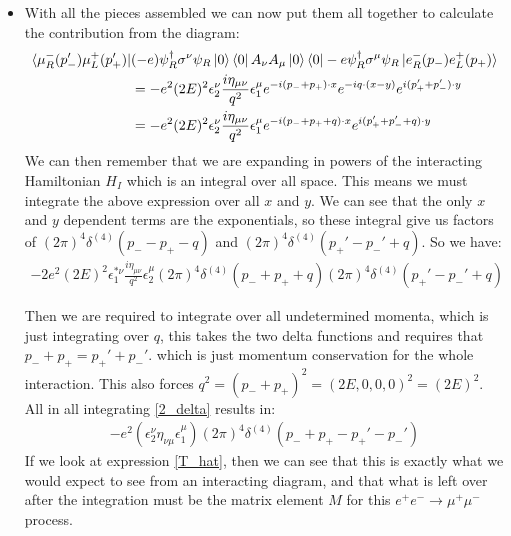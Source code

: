 \documentclass[11pt]{article}
\numberwithin{equation}{section}
\begin{document}
\begin{itemize}
     \item With all the pieces assembled we can now put them all together to calculate the contribution from the diagram:
     \begin{align*}
           \bra{\mu_R^{-}(p_-')\mu_L^{+}(p_+')}&(- e)\psi^{\dagger}_R\sigma^{\nu}\psi_R \ket{0}\bra{0} A_{\nu} A_{\mu}\ket{0}\bra{0}- e\psi^{\dagger}_R\sigma^{\mu}\psi_R\ket{e_R^{-}(p_-)e_L^{+}(p_+)} \\
           & = -e^2(2E)^2\epsilon_2^{\nu}\frac{i\eta_{\mu\nu}}{q^2}\epsilon^{\mu}_1e^{-i(p_-+p_+)\cdot x}e^{-iq \cdot (x - y)}e^{i(p_+'+p_-')\cdot y} \\
            & = -e^2(2E)^2\epsilon_2^{\nu}\frac{i\eta_{\mu\nu}}{q^2}\epsilon^{\mu}_1e^{-i(p_-+p_++q)\cdot x}e^{i(p_+'+p_-'+q)\cdot y}
     \end{align*}
     We can then remember that we are expanding in powers of the interacting Hamiltonian $H_I$ which is an integral over all space. This means we must integrate the above expression over all $x$ and $y$. We can see that the only $x$ and $y$ dependent terms are the exponentials, so these integral give us factors of $(2\pi)^4\delta^{(4)}(p_--p_+ -q)$ and $(2\pi)^4\delta^{(4)}(p_+'-p_-' +q)$. So we have:
     \begin{align}
     \label{2_delta}
         -2e^2(2E)^2\epsilon^{\ast\nu}_1\frac{i\eta_{\mu\nu}}{q^2}\epsilon^{\mu}_{2}(2\pi)^4\delta^{(4)}(p_-+p_+ +q)(2\pi)^4\delta^{(4)}(p_+'-p_-'+q)
     \end{align}

     Then we are required to integrate over all undetermined momenta, which is just integrating over $q$, this takes the two delta functions and requires that $p_-+p_+ = p_+'+p_-'$. which is just momentum conservation for the whole interaction. This also forces $q^2 = (p_-+p_+)^2 = (2E,0,0,0)^2 = (2E)^2$. All in all integrating \ref{2_delta} results in:
     \begin{align*}
          -e^2(\epsilon_2^{\nu}\eta_{\nu\mu}\epsilon_{1}^{\mu})(2\pi)^4\delta^{(4)}(p_-+p_+-p_+'-p_-')
     \end{align*}
      If we look at expression \ref{T_hat}, then we can see that this is exactly what we would expect to see from an interacting diagram, and that what is left over after the integration must be the matrix element $M$ for this $e^+e^- \rightarrow \mu^+\mu^-$ process. 


\end{itemize}
\end{document}

